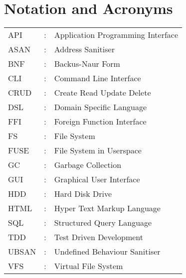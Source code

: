 \chapter*{Notation and Acronyms}
\vspace{1cm}

\noindent
\begin{tabular}{lcl}
    API &: & Application Programming Interface \\
    ASAN &: & Address Sanitiser \\
    BNF &: & Backus-Naur Form \\
    CLI &: & Command Line Interface \\
    CRUD &: & Create Read Update Delete \\
    DSL &: & Domain Specific Language \\
    FFI &: & Foreign Function Interface \\
    FS &: & File System \\
    FUSE &: & File System in Userspace \\
    GC &: & Garbage Collection \\
    GUI &: & Graphical User Interface \\
    HDD &: & Hard Disk Drive \\
    HTML &: & Hyper Text Markup Language \\
    SQL &: & Structured Query Language \\
    TDD &: & Test Driven Development \\
    UBSAN &: & Undefined Behaviour Sanitiser \\
    VFS &: & Virtual File System \\
\end{tabular}
